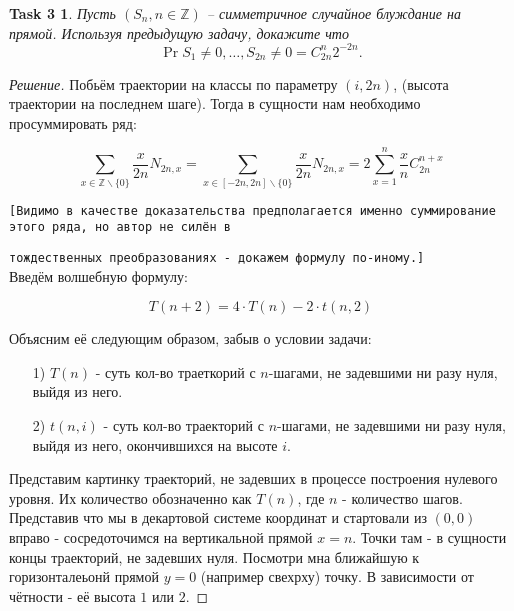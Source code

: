 \documentclass{article}
\newtheorem*{task3}{Task 3}
\newcommand{\Z}{\mathbb{Z}}
\begin{document}
\begin{task3}
            Пусть $(S_n, n\in \Z)$ -- симметричное случайное блуждание на прямой. Используя предыдущую задачу, докажите что
            \[
                \Pr{S_1 \neq 0,\dots, S_{2n} \neq 0} = C_{2n}^n 2^{-2n}.
            \]
        \end{task3}
        \begin{proof}[Решение]
        Побьём траектории на классы по параметру $(i, 2n)$, (высота траектории на последнем шаге). Тогда в сущности нам необходимо просуммировать ряд:
        
        \[
        \sum_{x \in \mathbb {Z} \backslash \{0\}}^{} \frac{x}{2n} N_{2n, x} = \sum_{x \in [-2n, 2n] \backslash \{0\}}   \frac{x}{2n} N_{2n, x} = 2 \sum_{x = 1}^{n}   \frac{x}{n} C_{2n}^{n+x} 
        \]
        
        
        \vspace{\baselineskip}
        
        \texttt{[Видимо в качестве доказательства предполагается именно суммирование этого ряда, но автор не силён в}
        
        \texttt{тождественных преобразованиях - докажем формулу по-иному.]}\\
        
        Введём волшебную формулу:
        
\[
         T(n+2) = 4 \cdot T(n) - 2 \cdot t(n, 2)
\]
        
        Объясним её следующим образом, забыв о условии задачи:
        
        \begin{enumerate}
            \item[1)] $T(n)$ - суть кол-во траеткорий с $n$-шагами, не задевшими ни разу нуля, выйдя из него.
            \item[2)] $t(n, i)$ - суть кол-во траекторий с $n$-шагами, не задевшими ни разу нуля, выйдя из него, окончившихся на высоте $i$. 
            
        \end{enumerate}
        
        Представим картинку траекторий, не задевших в процессе построения нулевого уровня. Их количество обозначенно как $T(n)$, где $n$ - количество шагов. Представив что мы в декартовой системе координат и стартовали из $(0, 0)$ вправо - сосредоточимся на вертикальной прямой $x = n$. Точки там - в сущности концы траекторий, не задевших нуля. Посмотри мна ближайшую к горизонталеьонй прямой $y = 0$ (например свехрху) точку. В зависимости от чётности - её высота $1$ или $2$.
        

\end{proof}
\end{document}
